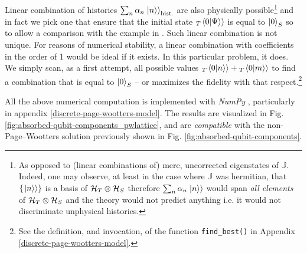\citereset
Linear combination of histories $\sum_n \alpha_n \left.\left| n \right\rangle\right\rangle_{\text{hist.}}$
are also physically possible\footnote{
  As opposed to (linear combinations of) mere, uncorrected eigenstates of $\mathbb{J}$.
  Indeed, one may observe,
  at least in the case where $\mathbb{J}$ was hermitian,
  that $\left\{\left.\left| n \right\rangle\right\rangle\right\}$ is a basis
  of $\mathcal{H}_T \otimes \mathcal{H}_S$ therefore
  $\sum_n \alpha_n \left.\left| n \right\rangle\right\rangle$ would span \emph{all elements}
  of $\mathcal{H}_T \otimes \mathcal{H}_S$ and the theory would not predict anything i.e.
  it would not discriminate unphysical histories.
}
and in fact we pick
one that ensure that the initial state ${}_{T}\!\left.\left\langle 0 \middle| \Psi \right\rangle\right\rangle$ is equal to $\ket{0}_S$
so to allow a comparison with the example in \cite{RuschhauptAbsorption}.
Such linear combination is not unique. For reasons of numerical stability,
a linear combination with coefficients in the order of 1 would be ideal if it exists.
In this particular problem, it does.
We simply scan, as a first attempt, all possible values ${}_{T}\!\left.\left\langle 0 \middle| n \right\rangle\right\rangle + {}_{T}\!\left.\left\langle 0 \middle| m \right\rangle\right\rangle$
to find a combination that is equal to $\ket{0}_S$
-- or maximizes the fidelity with that respect.\footnote{
  See the definition, and invocation, of the function \texttt{find_best()} in Appendix \ref{discrete-page-wootters-model}.
}

All the above numerical computation is implemented with \emph{NumPy} \parencite{comp:numpy},
particularly in appendix
\ref{discrete-page-wootters-model}.
The results are visualized in
Fig. \ref{fig:absorbed-qubit-components_pwlattice},
and are \emph{compatible} with the non-Page--Wootters
solution previously shown in Fig. \ref{fig:absorbed-qubit-components}.

